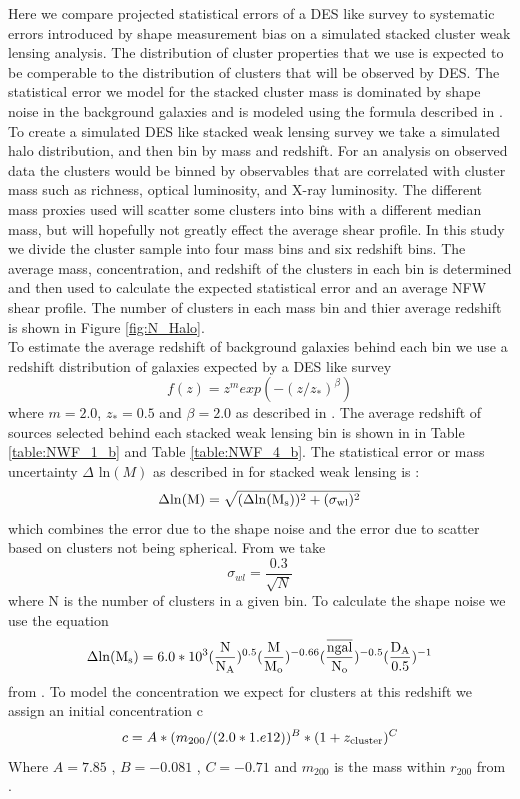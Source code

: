 Here we compare projected statistical errors of a DES like survey 
to systematic errors introduced by shape measurement bias on 
a simulated stacked cluster weak lensing
analysis. The distribution of cluster properties that we use is 
expected to be comperable to the distribution of clusters that will
be observed by DES. The statistical error we model for the stacked
cluster mass is dominated by shape noise in the background galaxies
and is modeled using the formula described in \citep{obscos, mbecker}.
\indent To create a simulated DES like stacked weak lensing survey we
take a simulated halo distribution, and then bin by mass and
redshift. For an analysis on observed data the clusters would
be binned by observables that are correlated with cluster mass such as richness,
optical luminosity, and X-ray luminosity. The different mass proxies used will
scatter some clusters into bins with a different median mass, but
will hopefully not greatly effect the average shear profile. In this
study we divide the cluster sample into four mass bins and six
redshift bins. The average mass, concentration, and redshift of the
clusters in each bin is determined and then used to calculate the
expected statistical error and an average NFW shear profile.  The
number of clusters in each mass bin and thier average redshift is
shown in Figure \ref{fig:N_Halo}. \\  
\indent To estimate the average redshift of background galaxies behind
each bin 
we use a redshift distribution of galaxies expected by a DES like survey
\begin{equation}
f(z) = z^m exp(-( z/z_* )^{\beta}) 
\end{equation}
where $m=2.0 $, $z_*=0.5$ and $\beta = 2.0 $ as described in
\citep{obscos}. The average redshift of sources selected behind each
stacked weak lensing bin is shown in in Table
\ref{table:NWF_1_b} and Table \ref{table:NWF_4_b}.
\indent
The statistical error or mass uncertainty $\Delta$ ln$(M)$ as
described in \citet{obscos} for stacked weak lensing is :
\begin{equation}
\Delta \rm{ln}(M) = \sqrt{ (\Delta  \rm{ln} (M_{s}))^2 +
(\sigma_{wl} )^2 }
\end{equation}
which combines the error due to the shape noise and the error due to
scatter based on clusters not being spherical. From \citep{mbecker}
we take
\begin{equation}
\sigma_{wl} = \frac{0.3}{\sqrt{N}}
\end{equation}
where N is the number of clusters in a given bin. To calculate the
shape noise we use the equation
\begin{equation}
\Delta \rm{ln} (M_{s}) = 6.0*10^3
(\frac{N}{N_{A}})^{0.5} (\frac{M}{M_{o}})^{-0.66} (\frac{\overline{ngal}}{N_{o}})^{-0.5}(\frac{D_{A}}{0.5})^{-1}
\end{equation}
from \citep{obscos} . To model the concentration we expect
for clusters at this redshift we assign an initial concentration c
\begin{equation}
c= A*( m_{200}/(2.0*1.e12))^{B}*(1 + z_{\rm{cluster}})^{C}
\end{equation}
Where  $ A = 7.85 $ ,  $ B = -0.081 $ , $ C= -0.71 $ and $m_{200}$ is
the mass within $r_{200}$ from \citep{oguri}.


